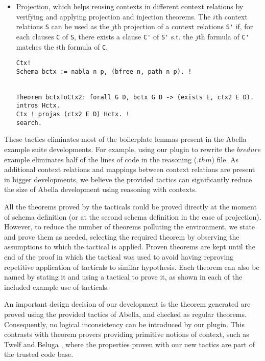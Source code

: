 \documentclass[nocopyrightspace,authoryear]{sigplanconf}
\begin{document}
\begin{itemize}
\item Projection, which helps reusing contexts in different context relations by verifying and applying projection and injection theorems. The $i$th context relations \lstinline|S| can be used as the $j$th projection of a context relations \lstinline|S'| if, for each clauses \lstinline|C| of \lstinline|S|, there exists a clause \lstinline|C'| of \lstinline|S'| s.t. the $j$th formula of \lstinline|C'| matches the $i$th formula of \lstinline|C|.
\begin{lstlisting}
Ctx!
Schema bctx := nabla n p, (bfree n, path n p). !


Theorem bctxToCtx2: forall G D, bctx G D -> (exists E, ctx2 E D).
intros Hctx. 
Ctx ! projas (ctx2 E D) Hctx. ! 
search.
\end{lstlisting}


\end{itemize}
These tactics eliminates most of the boilerplate lemmas present in the Abella example suite developments. For example, using our plugin to rewrite the $bredure$ example eliminates half of the lines of code in the reasoning ($.thm$) file. As additional context relations and mappings between context relations are present in bigger developments, we believe the provided tactics can significantly reduce the size of Abella development using reasoning with contexts.

All the theorems proved by the tacticals could be proved directly at the moment of schema definition (or at the second schema definition in the case of projection). However, to reduce the number of theorems polluting the environment, we state and prove them as needed, selecting the required theorem by observing the assumptions to which the tactical is applied. Proven theorems are kept until the end of the proof in which the tactical was used to avoid having reproving repetitive application of tacticals to similar hypothesis. Each theorem can also be named by stating it and using a tactical to prove it, as shown in each of the included example use of tacticals.

An important design decision of our development is the theorem generated are proved using the provided tactics of Abella, and checked as regular theorems. Consequently, no logical inconsistency can be introduced by our plugin. This contrasts with theorem provers providing primitive notions of context, such as Twelf \cite{twelfsys} and Beluga \cite{belugasys}, where the properties proven with our new tactics are part of the trusted code base.
\end{document}
